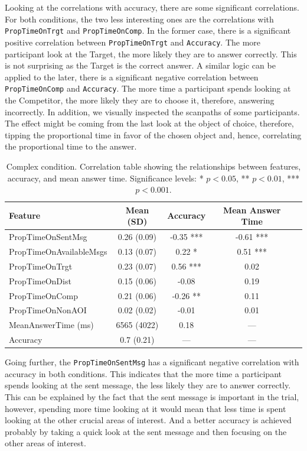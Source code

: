 Looking at the correlations with accuracy, there are some significant correlations. For both conditions, the two less interesting ones are the correlations with \texttt{PropTimeOnTrgt} and \texttt{PropTimeOnComp}. In the former case, there is a significant positive correlation between \texttt{PropTimeOnTrgt} and \texttt{Accuracy}. The more participant look at the Target, the more likely they are to answer correctly. This is not surprising as the Target is the correct answer. A similar logic can be applied to the later, there is a significant negative correlation between \texttt{PropTimeOnComp} and \texttt{Accuracy}. The more time a participant spends looking at the Competitor, the more likely they are to choose it, therefore, answering incorrectly. In addition, we visually inspected the scanpaths of some participants. The effect might be coming from the last look at the object of choice, therefore, tipping the proportional time in favor of the chosen object and, hence, correlating the proportional time to the answer.

\begin{table}[h!]
\centering
\begin{tabular}{|l|c|c|c|c|}
\hline
\textbf{Feature} & \textbf{Mean (SD)} & \textbf{Accuracy} & \textbf{Mean Answer Time} \\ \hline
PropTimeOnSentMsg & 0.26 (0.09) & -0.35 *** & -0.61 *** \\ \hline
PropTimeOnAvailableMsgs & 0.13 (0.07) & 0.22 * & 0.51 *** \\ \hline
PropTimeOnTrgt & 0.23 (0.07) & 0.56 *** & 0.02 \\ \hline
PropTimeOnDist & 0.15 (0.06) & -0.08 & 0.19 \\ \hline
PropTimeOnComp & 0.21 (0.06) & -0.26 ** & 0.11 \\ \hline
PropTimeOnNonAOI & 0.02 (0.02) & -0.01 & 0.01 \\ \hline
MeanAnswerTime (ms) & 6565 (4022) & 0.18 & --- \\ \hline
Accuracy & 0.7 (0.21) & --- & --- \\ \hline
\end{tabular}
\caption{Complex condition. Correlation table showing the relationships between features, accuracy, and mean answer time. Significance levels: * $p < 0.05$, ** $p < 0.01$, *** $p < 0.001$.}
\label{tab:correlation_table_complex}
\end{table}

Going further, the \texttt{PropTimeOnSentMsg} has a significant negative correlation with accuracy in both conditions. This indicates that the more time a participant spends looking at the sent message, the less likely they are to answer correctly. This can be explained by the fact that the sent message is important in the trial, however, spending more time looking at it would mean that less time is spent looking at the other crucial areas of interest. And a better accuracy is achieved probably by taking a quick look at the sent message and then focusing on the other areas of interest. 


